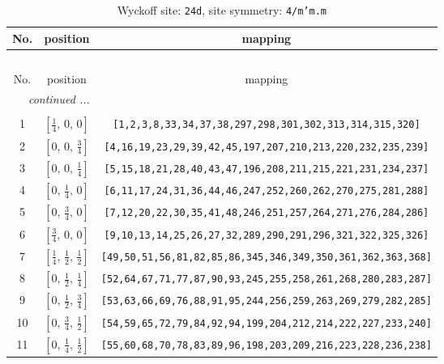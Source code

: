 \documentclass[fleqn,8pt]{jsarticle}
\begin{document}
\begin{longtable}{ccc}
\caption{Wyckoff site: {\tt 24d}, site symmetry: {\tt 4/m'm.m}}
 \\
 \hline \hline
No. & position & mapping \\ \hline \endfirsthead

\multicolumn{2}{l}{\tablename\ \thetable{}} \\
 \hline \hline
No. & position & mapping \\ \hline \endhead

 \hline \hline
\multicolumn{2}{r}{\footnotesize\it continued ...} \\ \endfoot

 \hline \hline
\multicolumn{2}{r}{} \\ \endlastfoot

1 & $\left[ \frac{1}{4},\, 0,\, 0 \right]$ & {\tt [1,2,3,8,33,34,37,38,297,298,301,302,313,314,315,320]} \\ \hline
2 & $\left[ 0,\, 0,\, \frac{3}{4} \right]$ & {\tt [4,16,19,23,29,39,42,45,197,207,210,213,220,232,235,239]} \\ \hline
3 & $\left[ 0,\, 0,\, \frac{1}{4} \right]$ & {\tt [5,15,18,21,28,40,43,47,196,208,211,215,221,231,234,237]} \\ \hline
4 & $\left[ 0,\, \frac{1}{4},\, 0 \right]$ & {\tt [6,11,17,24,31,36,44,46,247,252,260,262,270,275,281,288]} \\ \hline
5 & $\left[ 0,\, \frac{3}{4},\, 0 \right]$ & {\tt [7,12,20,22,30,35,41,48,246,251,257,264,271,276,284,286]} \\ \hline
6 & $\left[ \frac{3}{4},\, 0,\, 0 \right]$ & {\tt [9,10,13,14,25,26,27,32,289,290,291,296,321,322,325,326]} \\ \hline
7 & $\left[ \frac{1}{4},\, \frac{1}{2},\, \frac{1}{2} \right]$ & {\tt [49,50,51,56,81,82,85,86,345,346,349,350,361,362,363,368]} \\ \hline
8 & $\left[ 0,\, \frac{1}{2},\, \frac{1}{4} \right]$ & {\tt [52,64,67,71,77,87,90,93,245,255,258,261,268,280,283,287]} \\ \hline
9 & $\left[ 0,\, \frac{1}{2},\, \frac{3}{4} \right]$ & {\tt [53,63,66,69,76,88,91,95,244,256,259,263,269,279,282,285]} \\ \hline
10 & $\left[ 0,\, \frac{3}{4},\, \frac{1}{2} \right]$ & {\tt [54,59,65,72,79,84,92,94,199,204,212,214,222,227,233,240]} \\ \hline
11 & $\left[ 0,\, \frac{1}{4},\, \frac{1}{2} \right]$ & {\tt [55,60,68,70,78,83,89,96,198,203,209,216,223,228,236,238]} \\ \hline

\end{longtable}
\end{document}
